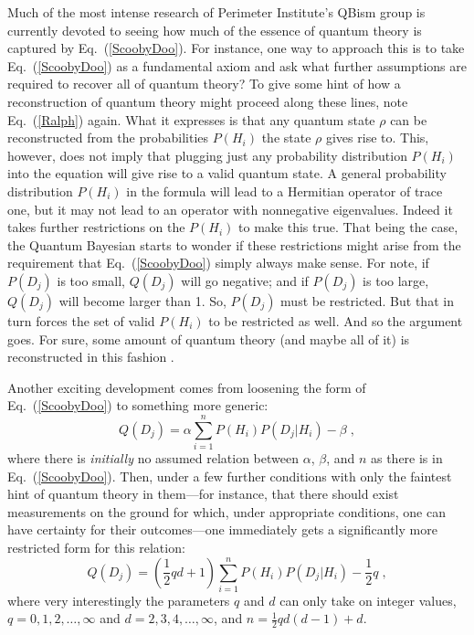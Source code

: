 Much of the most intense research of Perimeter Institute's QBism group is currently devoted to seeing how much of the essence of quantum theory is captured by Eq.~(\ref{ScoobyDoo}).  For instance, one way to approach this is to take Eq.~(\ref{ScoobyDoo}) as a fundamental axiom and ask what further assumptions are required to recover all of quantum theory?  To give some hint of how a reconstruction of quantum theory might proceed along these lines, note Eq.~(\ref{Ralph}) again.  What it expresses is that any quantum state $\rho$ can be reconstructed from the probabilities $P(H_i)$ the state $\rho$ gives rise to.  This, however, does not imply that plugging just any probability distribution $P(H_i)$ into the equation will give rise to a valid quantum state.  A general probability distribution $P(H_i)$ in the formula will lead to a Hermitian operator of trace one, but it may not lead to an operator with nonnegative eigenvalues.  Indeed it takes further restrictions on the $P(H_i)$ to make this true.  That being the case, the Quantum Bayesian starts to wonder if these restrictions might arise from the requirement that Eq.~(\ref{ScoobyDoo}) simply always make sense.  For note, if $P(D_j)$ is too small, $Q(D_j)$ will go negative; and if $P(D_j)$ is too large, $Q(D_j)$ will become larger than 1.  So, $P(D_j)$ must be restricted.  But that in turn forces the set of valid $P(H_i)$ to be restricted as well.  And so the argument goes.  For sure, some amount of quantum theory (and maybe all of it) is reconstructed in this fashion \cite{Fuchs09a,Appleby09a,Fuchs09b,Appleby09b}.

Another exciting development comes from loosening the form of Eq.~(\ref{ScoobyDoo}) to something more generic:
\begin{equation}
Q(D_j)=\alpha\sum_{i=1}^n P(H_i) P(D_j|H_i) - \beta\;,
\end{equation}
where there is {\it initially\/} no assumed relation between $\alpha$, $\beta$, and $n$ as there is in Eq.~(\ref{ScoobyDoo}).  Then, under a few further conditions with only the faintest hint of quantum theory in them---for instance, that there should exist measurements on the ground for which, under appropriate conditions, one can have certainty for their outcomes---one immediately gets a significantly more restricted form for this relation:
\begin{equation}
Q(D_j)=\left(\frac{1}{2} qd+1\right)\sum_{i=1}^{n} P(H_i) P(D_j|H_i) - \frac12 q\;,
\label{ExNihiloOmnia}
\end{equation}
where very interestingly the parameters $q$ and $d$ can only take on integer values, $q=0,1,2,\ldots,\infty$ and $d=2,3,4,\ldots,\infty$, and $n=\frac12 qd(d-1) + d$.

